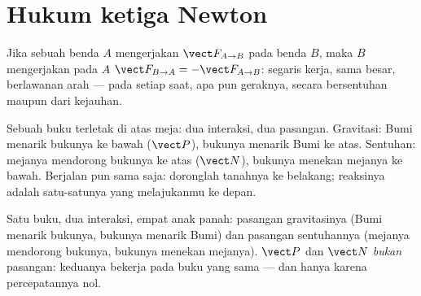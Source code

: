 \section{Hukum ketiga Newton}

\begin{theorem}\label{thm:g12:newtons-laws:third}
Jika sebuah benda $A$ mengerjakan  $\vect F_{A \to B}$ pada benda $B$, maka $B$
mengerjakan pada $A$  $\vect F_{B \to A} = -\vect F_{A \to B}$: segaris kerja,
sama besar, berlawanan arah --- pada setiap saat, apa pun geraknya, secara bersentuhan
maupun dari kejauhan.
\end{theorem}
\admitted

\begin{example}\label{ex:g12:newtons-laws:book}
Sebuah buku terletak di atas meja: dua interaksi, dua pasangan. Gravitasi: Bumi
menarik bukunya ke bawah ($\vect P$), bukunya menarik Bumi ke atas. Sentuhan: mejanya
mendorong bukunya ke atas ($\vect N$), bukunya menekan mejanya ke bawah. Berjalan pun
sama saja: doronglah tanahnya ke belakang; reaksinya adalah satu-satunya  yang
melajukanmu ke depan.
\end{example}

\begin{omfigure}

{\small Satu buku, dua interaksi, empat anak panah: pasangan gravitasinya (Bumi
menarik bukunya, bukunya menarik Bumi) dan pasangan sentuhannya (mejanya mendorong
bukunya, bukunya menekan mejanya). $\vect P$ dan $\vect N$ \emph{bukan} pasangan:
keduanya bekerja pada buku yang sama --- dan  hanya karena
percepatannya nol.}
\end{omfigure}

